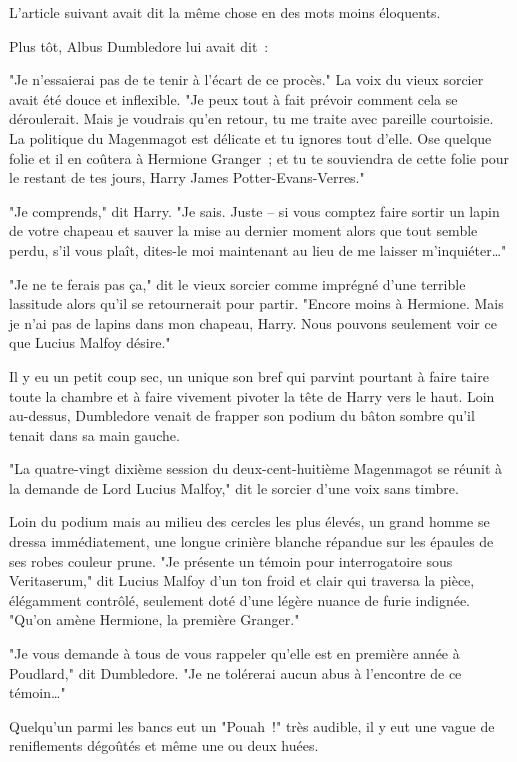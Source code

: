 L'article suivant avait dit la même chose en des mots moins éloquents.

Plus tôt, Albus Dumbledore lui avait dit~:
\begin{em}
"Je n'essaierai pas de te tenir à l'écart de ce procès." La voix du vieux sorcier avait été douce et inflexible. "Je peux tout à fait prévoir comment cela se déroulerait. Mais je voudrais qu'en retour, tu me traite avec pareille courtoisie. La politique du Magenmagot est délicate et tu ignores tout d'elle. Ose quelque folie et il en coûtera à Hermione Granger~; et tu te souviendra de cette folie pour le restant de tes jours, Harry James Potter-Evans-Verres."

"Je comprends," dit Harry. "Je sais. Juste -- si vous comptez faire sortir un lapin de votre chapeau et sauver la mise au dernier moment alors que tout semble perdu, s'il vous plaît, dites-le moi maintenant au lieu de me laisser m'inquiéter…"

"Je ne te ferais pas ça," dit le vieux sorcier comme imprégné d'une terrible lassitude alors qu'il se retournerait pour partir. "Encore moins à Hermione. Mais je n'ai pas de lapins dans mon chapeau, Harry. Nous pouvons seulement voir ce que Lucius Malfoy désire." \end{em}

Il y eu un petit coup sec, un unique son bref qui parvint pourtant à faire taire toute la chambre et à faire vivement pivoter la tête de Harry vers le haut. Loin au-dessus, Dumbledore venait de frapper son podium du bâton sombre qu'il tenait dans sa main gauche.

"La quatre-vingt dixième session du deux-cent-huitième Magenmagot se réunit à la demande de Lord Lucius Malfoy," dit le sorcier d'une voix sans timbre.

Loin du podium mais au milieu des cercles les plus élevés, un grand homme se dressa immédiatement, une longue crinière blanche répandue sur les épaules de ses robes couleur prune. "Je présente un témoin pour interrogatoire sous Veritaserum," dit Lucius Malfoy d'un ton froid et clair qui traversa la pièce, élégamment contrôlé, seulement doté d'une légère nuance de furie indignée. "Qu'on amène Hermione, la première Granger."

"Je vous demande à tous de vous rappeler qu'elle est en première année à Poudlard," dit Dumbledore. "Je ne tolérerai aucun abus à l'encontre de ce témoin…"

Quelqu'un parmi les bancs eut un "Pouah~!" très audible, il y eut une vague de reniflements dégoûtés et même une ou deux huées.

